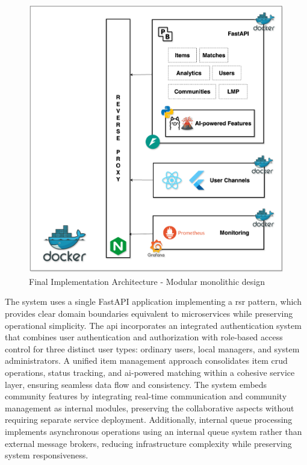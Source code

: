 \begin{figure}[htbp]
    \centering
    \includegraphics[width=\textwidth]{figs/chapter3/final_implementation_architecture.png}
    \caption[Final Implementation Architecture]{Final Implementation Architecture - Modular monolithic design}
    \label{fig:final_implementation_architecture}
\end{figure}


The system uses a single FastAPI application implementing a \ac{rsr} pattern, which provides clear domain boundaries equivalent to microservices while preserving operational simplicity. The \ac{api} incorporates an integrated authentication system that combines user authentication and authorization with role-based access control for three distinct user types: ordinary users, local managers, and system administrators. A unified item management approach consolidates item \ac{crud} operations, status tracking, and \ac{ai}-powered matching within a cohesive service layer, ensuring seamless data flow and consistency. The system embeds community features by integrating real-time communication and community management as internal modules, preserving the collaborative aspects without requiring separate service deployment. Additionally, internal queue processing implements asynchronous operations using an internal queue system rather than external message brokers, reducing infrastructure complexity while preserving system responsiveness.

